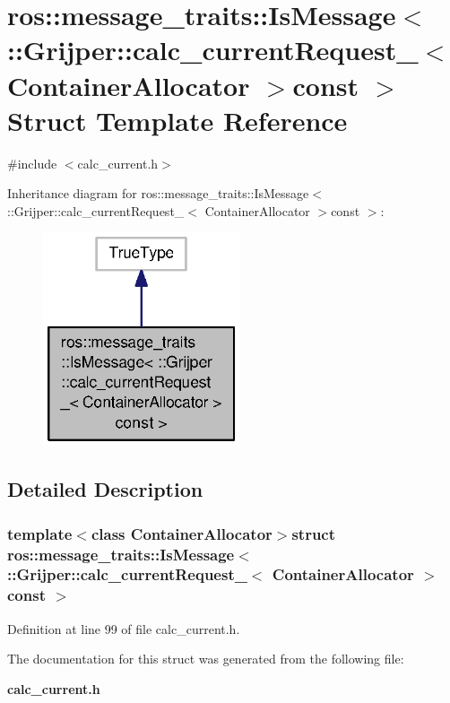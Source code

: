 \section{ros\-:\-:message\-\_\-traits\-:\-:Is\-Message$<$ \-:\-:Grijper\-:\-:calc\-\_\-current\-Request\-\_\-$<$ Container\-Allocator $>$const $>$ Struct Template Reference}
\label{structros_1_1message__traits_1_1IsMessage_3_01_1_1Grijper_1_1calc__currentRequest___3_01ContainerAllocator_01_4const_01_01_4}


{\ttfamily \#include $<$calc\-\_\-current.\-h$>$}



Inheritance diagram for ros\-:\-:message\-\_\-traits\-:\-:Is\-Message$<$ \-:\-:Grijper\-:\-:calc\-\_\-current\-Request\-\_\-$<$ Container\-Allocator $>$const $>$\-:\nopagebreak
\begin{figure}[H]
\begin{center}
\leavevmode
\includegraphics[width=164pt]{structros_1_1message__traits_1_1IsMessage_3_01_1_1Grijper_1_1calc__currentRequest___3_01Containe1f3b492123e81faf858341557b084ebb}
\end{center}
\end{figure}


\subsection{Detailed Description}
\subsubsection*{template$<$class Container\-Allocator$>$struct ros\-::message\-\_\-traits\-::\-Is\-Message$<$ \-::\-Grijper\-::calc\-\_\-current\-Request\-\_\-$<$ Container\-Allocator $>$const  $>$}



Definition at line 99 of file calc\-\_\-current.\-h.



The documentation for this struct was generated from the following file\-:\begin{DoxyCompactItemize}
\item 
{\bf calc\-\_\-current.\-h}\end{DoxyCompactItemize}

